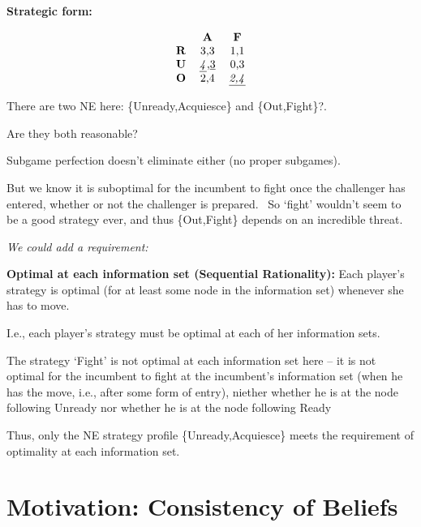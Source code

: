 \documentclass{article}
\begin{document}
\textbf{Strategic form:}

\begin{equation}
\begin{tabular}{ccc}
& \textbf{A} & \textbf{F} \\ 
\textbf{R} & 3,3 & 1,1 \\ 
\textbf{U} & \underline{\textit{4}},\underline{3} & 0,3 \\ 
\textbf{O} & 2,4 & \underline{\textit{2,4}}%
\end{tabular}%
\end{equation}

\bigskip

There are two NE here: \{Unready,Acquiesce\} and \{Out,Fight\}?.\ 

Are they both reasonable?

\bigskip

Subgame perfection doesn't eliminate either (no proper subgames).

\bigskip

But we know it is suboptimal for the incumbent to fight once the challenger
has entered, whether or not the challenger is prepared. \ So `fight'
wouldn't seem to be a good strategy ever, and thus \{Out,Fight\} depends on
an incredible threat.

\bigskip 

\bigskip 

\bigskip 

\textit{We could add a requirement:}

\textbf{Optimal at each information set (\textbf{Sequential Rationality}):}
Each player's strategy is optimal (for at least some node in the information
set) whenever she has to move.

I.e., each player's strategy must be optimal at each of her information sets.

\bigskip

The strategy `Fight' is not optimal at each information set here -- it is
not optimal for the incumbent to fight at the incumbent's information set
(when he has the move, i.e., after some form of entry), niether whether he
is at the node following Unready nor whether he is at the node following
Ready

\bigskip

Thus, only the NE strategy profile \{Unready,Acquiesce\} meets the
requirement of optimality at each information set.

\bigskip 

\section{Motivation: Consistency of Beliefs }
\end{document}
